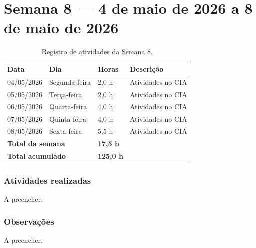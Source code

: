 
\section{Semana 8 --- 4 de maio de 2026 a 8 de maio de 2026}

\begin{table}[H]
\centering
\caption{Registro de atividades da Semana 8.}
\begin{tabular}{llll}
\toprule
\textbf{Data} & \textbf{Dia} & \textbf{Horas} & \textbf{Descrição} \\
\midrule
04/05/2026 & Segunda-feira & 2,0 h & Atividades no CIA \\
05/05/2026 & Terça-feira & 2,0 h & Atividades no CIA \\
06/05/2026 & Quarta-feira & 4,0 h & Atividades no CIA \\
07/05/2026 & Quinta-feira & 4,0 h & Atividades no CIA \\
08/05/2026 & Sexta-feira & 5,5 h & Atividades no CIA \\
\midrule
\multicolumn{2}{l}{\textbf{Total da semana}} & \textbf{17,5 h} & \\
\multicolumn{2}{l}{\textbf{Total acumulado}} & \textbf{125,0 h} & \\
\bottomrule
\end{tabular}
\end{table}

\subsubsection*{Atividades realizadas}

A preencher.

\subsubsection*{Observações}

A preencher.

